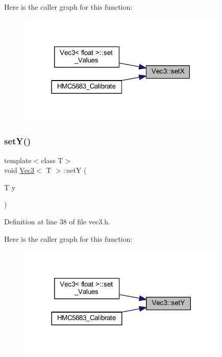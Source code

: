 Here is the caller graph for this function\+:
\nopagebreak
\begin{figure}[H]
\begin{center}
\leavevmode
\includegraphics[width=283pt]{class_vec3_a2d66e34e1ad4be888821158541fcd2ea_icgraph}
\end{center}
\end{figure}
\mbox{\label{class_vec3_a4dadb34f7d48268a101914b7a4771e68}} 
\subsubsection{\texorpdfstring{setY()}{setY()}}
{\footnotesize\ttfamily template$<$class T$>$ \\
void \mbox{\hyperlink{class_vec3}{Vec3}}$<$ T $>$\+::setY (\begin{DoxyParamCaption}\item[{T}]{y }\end{DoxyParamCaption})\hspace{0.3cm}{\ttfamily [inline]}}



Definition at line 38 of file vec3.\+h.

Here is the caller graph for this function\+:
\nopagebreak
\begin{figure}[H]
\begin{center}
\leavevmode
\includegraphics[width=284pt]{class_vec3_a4dadb34f7d48268a101914b7a4771e68_icgraph}
\end{center}
\end{figure}
\mbox{\label{class_vec3_a334f510fc72e3ae8cf50f61429db307a}} 
